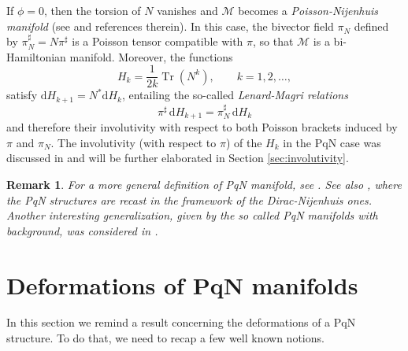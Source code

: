 \documentclass[12pt]{article}
\newtheorem{remark}[theorem]{Remark}
\newenvironment{rem}{\begin{remark} \rm}{\end{remark}}
\def\d{{\mathrm d}}
\def\M{{\mathcal M}}
\def\Tr{\operatorname{Tr}}
\begin{document}
If $\phi=0$, then the torsion of $N$ vanishes and $\M$ becomes a {\it Poisson-Nijenhuis manifold} (see \cite{KM} and references therein). In this case, the bivector field $\pi_N^{\phantom{\sharp}}$ defined by $\pi_N^\sharp=N\pi^\sharp$ is a Poisson tensor compatible with $\pi$, so that $\M$ is a bi-Hamiltonian manifold. 
Moreover, the functions
\begin{equation}
\label{tracce}
H_k=\frac1{2k}\Tr(N^k),\qquad k=1,2,\dots,
\end{equation}
satisfy $\d H_{k+1}=N^* \d H_{k}$, entailing
the so-called {\it Lenard-Magri relations\/} 
\begin{equation}
\label{LM-rel}
\pi^\sharp\, \d H_{k+1}=\pi_N^\sharp\, \d H_{k}
\end{equation}
and therefore their involutivity with respect to both Poisson brackets induced by $\pi$ and $\pi_N$. 
The involutivity (with respect to 
$\pi$) of the $H_k$ in the PqN case was discussed in \cite{FMOP2020} and will be further elaborated in Section \ref{sec:involutivity}.
\begin{rem} 
For a more general definition of PqN manifold, see \cite{BursztynDrummond2019}.
See also \cite{BursztynDrummondNetto2021}, where the PqN structures are recast in the %
framework of the Dirac-Nijenhuis ones. Another interesting generalization, given by the so called PqN manifolds with background, was considered in
\cite{Antunes2008,C-NdC-2010}.
\end{rem}


\section{Deformations of PqN manifolds}
\label{igor-connection}

In this section we remind a result concerning the deformations of a PqN structure. 
To do that, we need to recap a few well known notions. 
\end{document}
